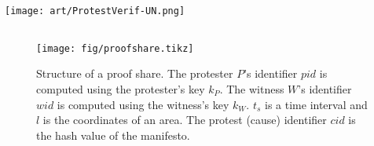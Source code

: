 \begin{columns}[t]
\begin{column}{0.32\linewidth}
    \texttt{[image: art/ProtestVerif-UN.png]}

  \end{column}

\end{columns}

\vfill

\begin{columns}[t]

  \begin{column}{0.32\linewidth}
    \begin{figure}
      \centering
      \texttt{[image: fig/proofshare.tikz]}
      \caption{%
        Structure of a proof share.
        The protester \(P\)'s identifier \(pid\) is computed using the protester's 
        key \(k_P\).
        The witness \(W\)'s identifier \(wid\) is computed using the witness's key 
        \(k_W\).
        \(t_s\) is a time interval and \(l\) is the coordinates of an area.
        The protest (cause) identifier \(cid\) is the hash value of the manifesto.
      }%
      \label{ProofShare}
    \end{figure}%


\end{column}
\end{columns}
